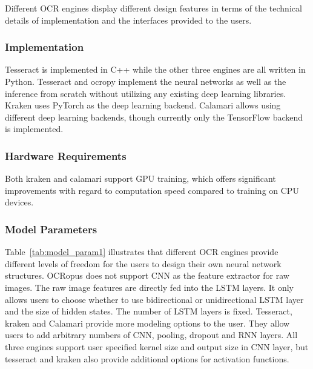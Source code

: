 \documentclass[conference]{IEEEtran}
\begin{document}

Different OCR engines display different design features in terms of the
technical details of implementation and the interfaces provided to the users.

\subsubsection{Implementation}

Tesseract is implemented in C++ while the
other three engines are all written in Python. Tesseract and ocropy
implement the neural networks as well as the inference from scratch without
utilizing any existing deep learning libraries. Kraken uses PyTorch as the
deep learning backend. Calamari allows using different deep learning backends,
though currently only the TensorFlow backend is implemented.


\subsubsection{Hardware Requirements}

Both kraken and calamari support GPU training, which offers significant
improvements with regard to computation speed compared to training on CPU devices.


\subsubsection{Model Parameters}

Table~\ref{tab:model_param1} illustrates that different OCR engines provide
different levels of freedom for the users to design their own neural network
structures. OCRopus does not support CNN as the feature extractor for raw
images. The raw image features are directly fed into the LSTM layers. It only
allows users to choose whether to use bidirectional or unidirectional LSTM
layer and the size of hidden states. The number of LSTM layers is fixed.
Tesseract, kraken and Calamari provide more modeling options to the user. They
allow users to add arbitrary numbers of CNN, pooling, dropout and RNN
layers. All three engines support user specified kernel size and output size in
CNN layer, but tesseract and kraken also provide additional options for
activation functions.
\end{document}
